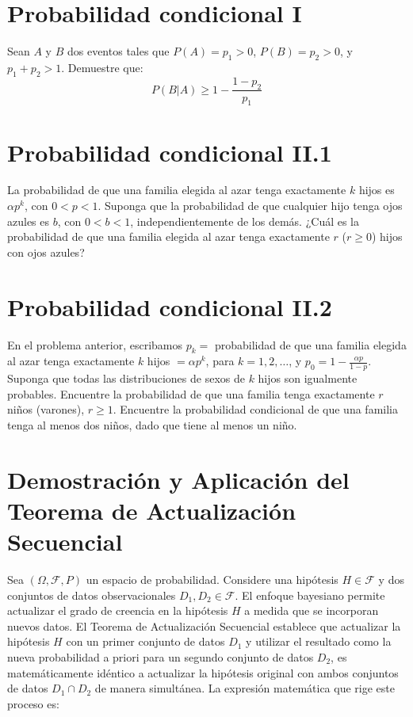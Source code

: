 \documentclass[a4paper]{article}
\begin{document}
\section{Probabilidad condicional I}
\label{sec:problema-17}

Sean $A$ y $B$ dos eventos tales que $P(A) = p_1 > 0$, $P(B) = p_2 > 0$, y $p_1 + p_2 > 1$. Demuestre que:
$$P(B | A) \ge 1 - \frac{1 - p_2}{p_1}$$

\section{Probabilidad condicional II.1}
\label{sec:problema-18}
La probabilidad de que una familia elegida al azar tenga exactamente $k$ hijos es $\alpha p^k$, con $0 < p < 1$. Suponga que la probabilidad de que cualquier hijo tenga ojos azules es $b$, con $0 < b < 1$, independientemente de los demás. ¿Cuál es la probabilidad de que una familia elegida al azar tenga exactamente $r$ ($r \ge 0$) hijos con ojos azules?

\section{Probabilidad condicional II.2}
\label{sec:problema-19}
En el problema anterior, escribamos $p_k =$ probabilidad de que una familia elegida al azar tenga exactamente $k$ hijos $= \alpha p^k$, para $k = 1, 2, \dots$, y $p_0 = 1 - \frac{\alpha p}{1-p}$.
Suponga que todas las distribuciones de sexos de $k$ hijos son igualmente probables. Encuentre la probabilidad de que una familia tenga exactamente $r$ niños (varones), $r \ge 1$. Encuentre la probabilidad condicional de que una familia tenga al menos dos niños, dado que tiene al menos un niño.


\section{Demostración y Aplicación del Teorema de Actualización Secuencial}
\label{sec:problema-20}

Sea $(\Omega, \mathcal{F}, P)$ un espacio de probabilidad. Considere una hipótesis $H \in \mathcal{F}$ y dos conjuntos de datos observacionales $D_1, D_2 \in \mathcal{F}$. El enfoque bayesiano permite actualizar el grado de creencia en la hipótesis $H$ a medida que se incorporan nuevos datos. El Teorema de Actualización Secuencial establece que actualizar la hipótesis $H$ con un primer conjunto de datos $D_1$ y utilizar el resultado como la nueva probabilidad a priori para un segundo conjunto de datos $D_2$, es matemáticamente idéntico a actualizar la hipótesis original con ambos conjuntos de datos $D_1 \cap D_2$ de manera simultánea. La expresión matemática que rige este proceso es:
\end{document}
